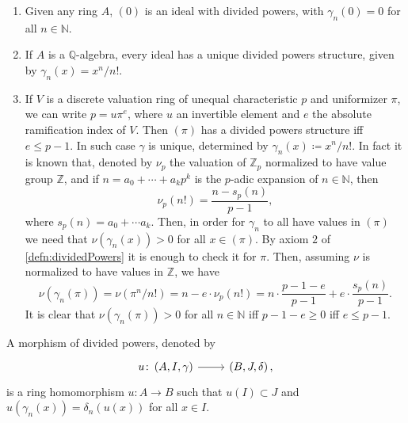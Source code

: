\documentclass[../Main]{subfiles}
\begin{document}
\begin{ex}\leavevmode\vspace{-.2\baselineskip}
\begin{enumerate}
	\item Given any ring $A$, $(0)$ is an ideal with divided powers,
		with $\gamma_n(0) = 0$ for all $n \in \mathbb{N}$.

	\item If $A$ is a $\mathbb{Q}$-algebra, every ideal has a unique
		divided powers structure, given by $\gamma_n(x) = x^n/n!$.

	\item If $V$ is a discrete valuation ring of unequal characteristic $p$
		and uniformizer $\pi$, we can write $p = u \pi^e$,
		where $u$ an invertible element and $e$ the absolute ramification
		index of $V$.
		Then $\left( \pi \right)$ has a divided powers structure iff $e \leq p-1$.
		In such case $\gamma$ is unique, determined by
		$\gamma_n(x) \coloneqq x^n/n!$.
		In fact it is known that, denoted by $\nu_p$ the valuation
		of $\mathbb{Z}_{p}$ normalized to have value group $\mathbb{Z}$,
		and if $n = a_0 + \cdots + a_kp^k$ is the $p$-adic expansion
		of $n \in \mathbb{N}$, then
		\begin{equation*}
			\nu_p(n!) = 
			\frac{n - s_p(n)}{p-1}
		,\end{equation*}
		where $s_p(n) = a_0 + \cdots a_k$.
		Then, in order for $\gamma_n$ to all have values in $(\pi)$
		we need that $\nu(\gamma_n(x)) > 0$ for all $x \in (\pi)$.
		By axiom $2$ of \cref{defn:dividedPowers}
		it is enough to check it for $\pi$.
		Then, assuming $\nu$ is normalized to have values in $\mathbb{Z}$,
		we have
		\begin{equation*}
			\nu(\gamma_n(\pi)) = \nu(\pi^n/n!) =
			n - e \cdot \nu_p(n!) =
			n \cdot \frac{p - 1 - e}{p - 1} + e \cdot \frac{s_p(n)}{p - 1}
		.\end{equation*}
		It is clear that $\nu(\gamma_n(\pi)) > 0$ for all $n \in \mathbb{N}$
		iff $p - 1 - e \geq 0$ iff $e \leq p - 1$.
\end{enumerate}
\end{ex} 


\begin{defn}
	A morphism of divided powers, denoted by
	\begin{equation*}
	\begin{tikzcd}[row sep = 0ex
		,/tikz/column 1/.append style={anchor=base east}
		,/tikz/column 2/.append style={anchor=base west}]
		u\colon \left(A, I, \gamma\right) 
		\arrow[r, "", rightarrow] &
		\left(B, J, \delta\right)
	,\end{tikzcd}
	\end{equation*} 
	is a ring homomorphism $u\colon A \to B$ such that
	$u(I) \subset J$ and $u(\gamma_n(x)) = \delta_n(u(x))$
	for all $x \in I$.
\end{defn}
\end{document}
